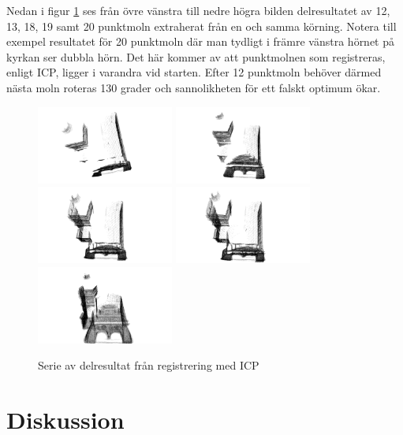Nedan i figur \ref{fig:registered_church_serie} ses från övre vänstra till nedre högra bilden delresultatet av 12, 13, 18, 19 samt 20 punktmoln extraherat från en och samma körning. Notera till exempel resultatet för 20 punktmoln där man tydligt i främre vänstra hörnet på kyrkan ser dubbla hörn. Det här kommer av att punktmolnen som registreras, enligt ICP, ligger i varandra vid starten. Efter 12 punktmoln behöver därmed nästa moln roteras 130 grader och sannolikheten för ett falskt optimum ökar.
\begin{figure}[H]
	\centering
	\includegraphics[width=45mm]{figures/12_pc.png}
	\includegraphics[width=45mm]{figures/13_pc.png}
	\includegraphics[width=45mm]{figures/18_pc.png}
	\includegraphics[width=45mm]{figures/19_pc.png}
	\includegraphics[width=45mm]{figures/20_pc.png}
	\caption{Serie av delresultat från registrering med ICP}
	\label{fig:registered_church_serie}
\end{figure}

\section{Diskussion}
\label{sec:discussion-karlsson}

